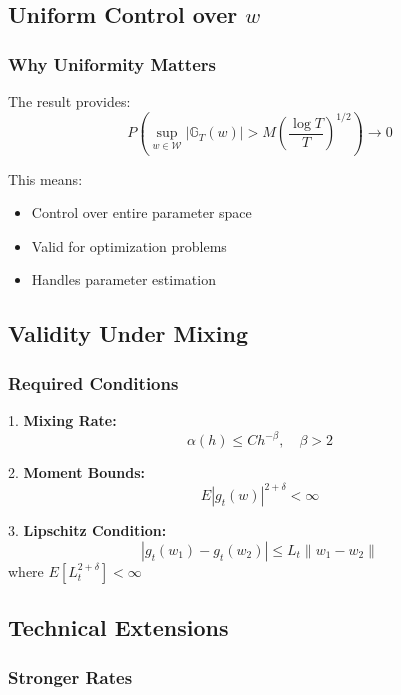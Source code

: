 \documentclass[12pt,article]{memoir}
\begin{document}
\subsection{Uniform Control over $w$}

\subsubsection{Why Uniformity Matters}

The result provides:
\begin{equation}
    P\left(\sup_{w \in \mathcal{W}} |\mathbb{G}_T(w)| > M\left(\frac{\log T}{T}\right)^{1/2}\right) \to 0
\end{equation}

This means:
\begin{itemize}
    \item Control over entire parameter space
    \item Valid for optimization problems
    \item Handles parameter estimation
\end{itemize}

\subsection{Validity Under Mixing}

\subsubsection{Required Conditions}

1. \textbf{Mixing Rate:}
\begin{equation}
    \alpha(h) \leq Ch^{-\beta}, \quad \beta > 2
\end{equation}

2. \textbf{Moment Bounds:}
\begin{equation}
    E|g_t(w)|^{2+\delta} < \infty
\end{equation}

3. \textbf{Lipschitz Condition:}
\begin{equation}
    |g_t(w_1) - g_t(w_2)| \leq L_t\|w_1 - w_2\|
\end{equation}
where $E[L_t^{2+\delta}] < \infty$

\subsection{Technical Extensions}

\subsubsection{Stronger Rates}
\end{document}
